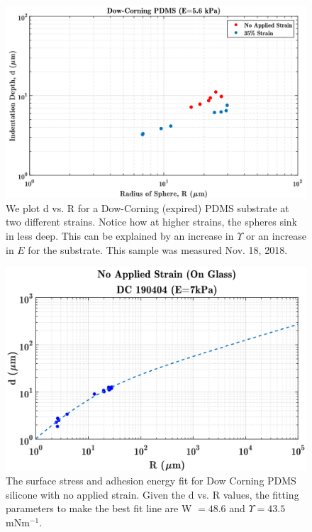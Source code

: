 \begin{figure}[h]
	\centering
	\includegraphics[width=\linewidth]{Chapters/Figures/d_vs_r_stretch_vs_nostretch.pdf}
	\caption[D vs. R Dow-Corning]{We plot d vs. R for a Dow-Corning (expired) PDMS substrate at two different strains. Notice how at higher strains, the spheres sink in less deep. This can be explained by an increase in $\Upsilon$ or an increase in $E$ for the substrate. This sample was measured Nov. 18, 2018.}
	\label{fig:dvsrstretchvsnostretchdc181115}
\end{figure}

\begin{figure}[h]
	\centering
	\includegraphics[width=\linewidth]{Chapters/Figures/WUps_fit_DC190404}
	\caption[Dow Corning W-$\Upsilon $ Fit]{The surface stress and adhesion energy fit for Dow Corning PDMS silicone with no applied strain. Given the d vs. R values, the fitting parameters to make the best fit line are W $ = 48.6$ and  $\Upsilon = 43.5$ mNm$^{-1}$.}
	\label{fig:wupsfitdc190404}
\end{figure}

